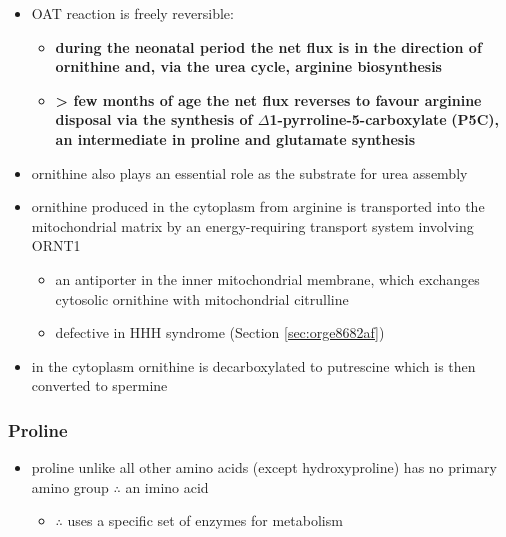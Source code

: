 \documentclass[12pt]{scrartcl}
\begin{document}
\begin{center}
\begin{center}
\begin{itemize}
\item OAT reaction is freely reversible:
\begin{itemize}
\item \textbf{during the neonatal period the net flux is in the direction of}
\textbf{ornithine and, via the urea cycle, arginine biosynthesis}
\item \textbf{\textgreater{} few months of age the net flux reverses to favour arginine}
\textbf{disposal via the synthesis of \(\Delta\)1-pyrroline-5-carboxylate}
\textbf{(P5C), an intermediate in proline and glutamate synthesis}
\end{itemize}
\item ornithine also plays an essential role as the substrate for urea assembly
\item ornithine produced in the cytoplasm from arginine is transported
into the mitochondrial matrix by an energy-requiring transport
system involving ORNT1
\begin{itemize}
\item an antiporter in the inner mitochondrial membrane, which exchanges
cytosolic ornithine with mitochondrial citrulline
\item defective in HHH syndrome (Section \ref{sec:orge8682af})
\end{itemize}
\item in the cytoplasm ornithine is decarboxylated to putrescine which is
then converted to spermine
\end{itemize}

\subsubsection{Proline}
\label{sec:org7211cca}
\begin{itemize}
\item proline unlike all other amino acids (except hydroxyproline) has
no primary amino group \(\therefore\) an imino acid
\begin{itemize}
\item \(\therefore\) uses a specific set of enzymes for metabolism
\end{itemize}
\end{itemize}

\begin{center}
\chemnameinit{}
\end{center}


\end{center}
\end{center}
\end{document}
